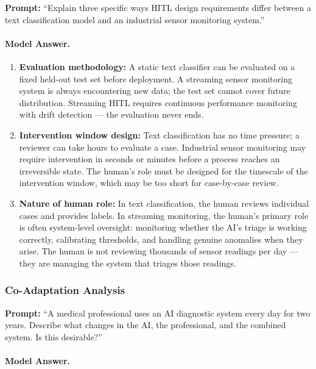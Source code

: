 \textbf{Prompt:} ``Explain three specific ways HITL design requirements differ between a text classification model and an industrial sensor monitoring system.''

\paragraph{Model Answer.}

\begin{enumerate}
    \item \textbf{Evaluation methodology:} A static text classifier can be evaluated on a fixed held-out test set before deployment. A streaming sensor monitoring system is always encountering new data; the test set cannot cover future distribution. Streaming HITL requires continuous performance monitoring with drift detection --- the evaluation never ends.

    \item \textbf{Intervention window design:} Text classification has no time pressure; a reviewer can take hours to evaluate a case. Industrial sensor monitoring may require intervention in seconds or minutes before a process reaches an irreversible state. The human's role must be designed for the timescale of the intervention window, which may be too short for case-by-case review.

    \item \textbf{Nature of human role:} In text classification, the human reviews individual cases and provides labels. In streaming monitoring, the human's primary role is often system-level oversight: monitoring whether the AI's triage is working correctly, calibrating thresholds, and handling genuine anomalies when they arise. The human is not reviewing thousands of sensor readings per day --- they are managing the system that triages those readings.
\end{enumerate}

\subsubsection{Co-Adaptation Analysis}

\textbf{Prompt:} ``A medical professional uses an AI diagnostic system every day for two years. Describe what changes in the AI, the professional, and the combined system. Is this desirable?''

\paragraph{Model Answer.}

